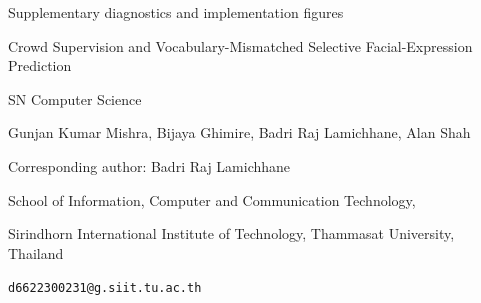 \documentclass[10pt]{article}
\begin{document}
\begin{center}
{\Large Supplementary diagnostics and implementation figures}\par\medskip
Crowd Supervision and Vocabulary-Mismatched Selective Facial-Expression Prediction\par\medskip
SN Computer Science\par\smallskip
Gunjan Kumar Mishra, Bijaya Ghimire, Badri Raj Lamichhane, Alan Shah\par\smallskip
Corresponding author: Badri Raj Lamichhane\par
School of Information, Computer and Communication Technology,\par
Sirindhorn International Institute of Technology, Thammasat University, Thailand\par
\texttt{d6622300231@g.siit.tu.ac.th}
\end{center}
\end{document}
